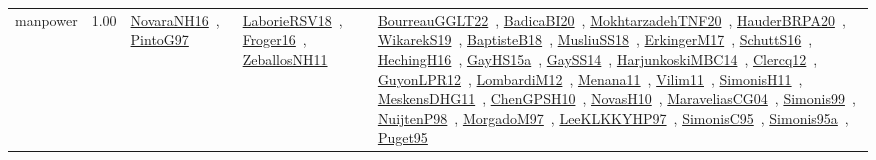 {\begin{longtable}{p{3cm}r>{\raggedright\arraybackslash}p{6cm}>{\raggedright\arraybackslash}p{6cm}>{\raggedright\arraybackslash}p{8cm}}
\index{manpower}\index{Concepts!manpower}manpower &  1.00 & \href{../works/NovaraNH16.pdf}{NovaraNH16}~\cite{NovaraNH16}, \href{../works/PintoG97.pdf}{PintoG97}~\cite{PintoG97} & \href{../works/LaborieRSV18.pdf}{LaborieRSV18}~\cite{LaborieRSV18}, \href{../works/Froger16.pdf}{Froger16}~\cite{Froger16}, \href{../works/ZeballosNH11.pdf}{ZeballosNH11}~\cite{ZeballosNH11} & \href{../works/BourreauGGLT22.pdf}{BourreauGGLT22}~\cite{BourreauGGLT22}, \href{../works/BadicaBI20.pdf}{BadicaBI20}~\cite{BadicaBI20}, \href{../works/MokhtarzadehTNF20.pdf}{MokhtarzadehTNF20}~\cite{MokhtarzadehTNF20}, \href{../works/HauderBRPA20.pdf}{HauderBRPA20}~\cite{HauderBRPA20}, \href{../works/WikarekS19.pdf}{WikarekS19}~\cite{WikarekS19}, \href{../works/BaptisteB18.pdf}{BaptisteB18}~\cite{BaptisteB18}, \href{../works/MusliuSS18.pdf}{MusliuSS18}~\cite{MusliuSS18}, \href{../works/ErkingerM17.pdf}{ErkingerM17}~\cite{ErkingerM17}, \href{../works/SchuttS16.pdf}{SchuttS16}~\cite{SchuttS16}, \href{../works/HechingH16.pdf}{HechingH16}~\cite{HechingH16}, \href{../works/GayHS15a.pdf}{GayHS15a}~\cite{GayHS15a}, \href{../works/GaySS14.pdf}{GaySS14}~\cite{GaySS14}, \href{../works/HarjunkoskiMBC14.pdf}{HarjunkoskiMBC14}~\cite{HarjunkoskiMBC14}, \href{../works/Clercq12.pdf}{Clercq12}~\cite{Clercq12}, \href{../works/GuyonLPR12.pdf}{GuyonLPR12}~\cite{GuyonLPR12}, \href{../works/LombardiM12.pdf}{LombardiM12}~\cite{LombardiM12}, \href{../works/Menana11.pdf}{Menana11}~\cite{Menana11}, \href{../works/Vilim11.pdf}{Vilim11}~\cite{Vilim11}, \href{../works/SimonisH11.pdf}{SimonisH11}~\cite{SimonisH11}, \href{../works/MeskensDHG11.pdf}{MeskensDHG11}~\cite{MeskensDHG11}, \href{../works/ChenGPSH10.pdf}{ChenGPSH10}~\cite{ChenGPSH10}, \href{../works/NovasH10.pdf}{NovasH10}~\cite{NovasH10}, \href{../works/MaraveliasCG04.pdf}{MaraveliasCG04}~\cite{MaraveliasCG04}, \href{../works/Simonis99.pdf}{Simonis99}~\cite{Simonis99}, \href{../works/NuijtenP98.pdf}{NuijtenP98}~\cite{NuijtenP98}, \href{../works/MorgadoM97.pdf}{MorgadoM97}~\cite{MorgadoM97}, \href{../works/LeeKLKKYHP97.pdf}{LeeKLKKYHP97}~\cite{LeeKLKKYHP97}, \href{../works/SimonisC95.pdf}{SimonisC95}~\cite{SimonisC95}, \href{../works/Simonis95a.pdf}{Simonis95a}~\cite{Simonis95a}, \href{../works/Puget95.pdf}{Puget95}~\cite{Puget95}\\

\end{longtable}}
